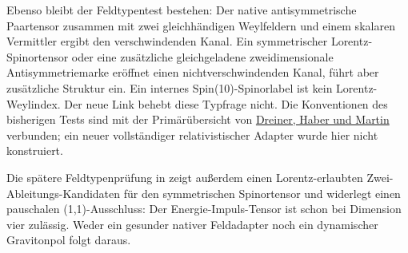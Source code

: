 Ebenso bleibt der Feldtypentest bestehen: Der native antisymmetrische
Paartensor zusammen mit zwei gleichhändigen Weylfeldern und einem
skalaren Vermittler ergibt den verschwindenden Kanal. Ein symmetrischer
Lorentz- Spinortensor oder eine zusätzliche gleichgeladene
zweidimensionale Antisymmetriemarke eröffnet einen nichtverschwindenden
Kanal, führt aber zusätzliche Struktur ein. Ein internes
Spin(10)-Spinorlabel ist kein Lorentz-Weylindex. Der neue Link behebt
diese Typfrage nicht. Die Konventionen des bisherigen Tests sind mit der
Primärübersicht von \href{https://arxiv.org/abs/0812.1594}{Dreiner,
Haber und Martin} verbunden; ein neuer vollständiger relativistischer
Adapter wurde hier nicht konstruiert.

Die spätere Feldtypenprüfung in  zeigt außerdem
einen Lorentz-erlaubten Zwei-Ableitungs-Kandidaten für den symmetrischen
Spinortensor und widerlegt einen pauschalen (1,1)-Ausschluss: Der
Energie-Impuls-Tensor ist schon bei Dimension vier zulässig. Weder ein
gesunder nativer Feldadapter noch ein dynamischer Gravitonpol folgt
daraus.

